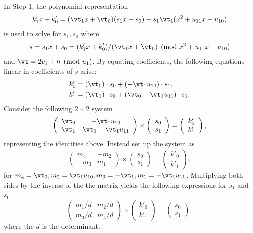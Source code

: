 In Step 1, the polynomial representation $$ k'_1x + k'_0 =
(\vt_1x + \vt_0)(s_1x + s_0) - s_1\vt_1(x^2 + u_{11}x + u_{10})$$ is used to
solve for $s_1,s_0$ where $$s = s_1x + s_0 = (k'_1x + k'_0)/(\vt_1x + \vt_0)
\pmod{x^2 + u_{11}x + u_{10}}$$ and $\vt = 2v_1 + h \pmod{u_1}$. By equating
coefficients, the following equations linear in coefficients of $s$ arise:  
\begin{align*} k'_0 &=
(\vt_0) \cdot s_0 + (-\vt_1u_{10}) \cdot s_1, \\
k'_1 &= (\vt_1) \cdot s_0 + (\vt_0 - \vt_1u_{11}) \cdot s_1.
\end{align*}
Consider the following $2 \times 2$ system $$ \left( \begin{array}{cc}
\vt_0 & -\vt_1u_{10}   \\
\vt_1 & \vt_0 -\vt_1u_{11}   \end{array} \right) \times \left( \begin{array}{c}
s_0   \\
s_1   \end{array} \right) = \left( \begin{array}{c}
k'_0   \\
k'_1   \end{array} \right), $$  representing the identities above. Instead 
set up the system  as $$ \left( \begin{array}{cc}
m_4 & -m_2   \\
-m_3 & m_1   \end{array} \right) \times \left( \begin{array}{c}
s_0   \\
s_1   \end{array} \right) = \left( \begin{array}{c}
k'_0   \\
k'_1   \end{array} \right),$$ for $m_4 = \vt_0, m_2 = \vt_1u_{10}, m_3 = -\vt_1,
m_1 = -\vt_1u_{11}$. Multiplying both sides by the inverse of the the matrix
yields the following expressions for $s_1$ and $s_0$ $$ \left( \begin{array}{cc}
m_1/d & m_2/d   \\
m_3/d & m_4/d   \end{array} \right) \times \left( \begin{array}{c}
k'_0   \\
k'_1   \end{array} \right) = \left( \begin{array}{c}
s_0   \\
s_1   \end{array} \right),$$ where the $d$ is the determinant.
